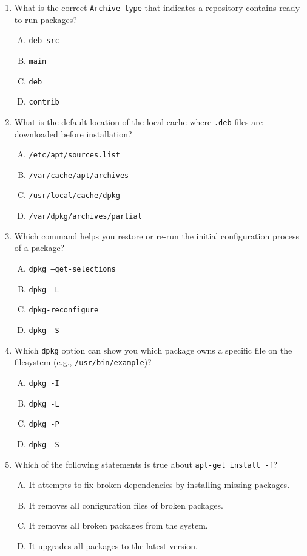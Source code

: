 \documentclass[a4paper]{report}
\begin{document}
\begin{enumerate}[1.]
    \item What is the correct \texttt{Archive type} that indicates a repository contains ready-to-run packages?  
    \begin{enumerate}[A)]
        \item \texttt{deb-src}  
        \item \texttt{main}  
        \item \texttt{deb}  
        \item \texttt{contrib}  
    \end{enumerate}

    \item What is the default location of the local cache where \texttt{.deb} files are downloaded before installation?  
    \begin{enumerate}[A)]
        \item \texttt{/etc/apt/sources.list}  
        \item \texttt{/var/cache/apt/archives}  
        \item \texttt{/usr/local/cache/dpkg}  
        \item \texttt{/var/dpkg/archives/partial}  
    \end{enumerate}

    \item Which command helps you restore or re-run the initial configuration process of a package?  
    \begin{enumerate}[A)]
        \item \texttt{dpkg --get-selections}  
        \item \texttt{dpkg -L}  
        \item \texttt{dpkg-reconfigure}  
        \item \texttt{dpkg -S}  
    \end{enumerate}

    \item Which \texttt{dpkg} option can show you which package owns a specific file on the filesystem (e.g., \texttt{/usr/bin/example})?  
    \begin{enumerate}[A)]
        \item \texttt{dpkg -I}  
        \item \texttt{dpkg -L}  
        \item \texttt{dpkg -P}  
        \item \texttt{dpkg -S}  
    \end{enumerate}

    \item Which of the following statements is true about \texttt{apt-get install -f}?  
    \begin{enumerate}[A)]
        \item It attempts to fix broken dependencies by installing missing packages.  
        \item It removes all configuration files of broken packages.  
        \item It removes all broken packages from the system.  
        \item It upgrades all packages to the latest version.  
    \end{enumerate}


\end{enumerate}
\end{document}
